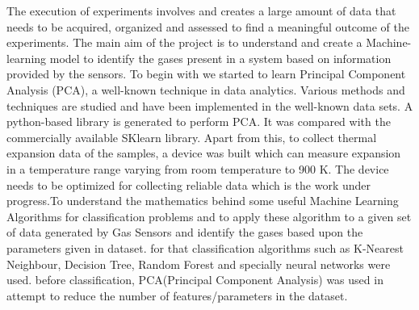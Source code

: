 \vspace{6pt}


\begin{flushleft}
    \setlength{\parskip}{0pt}
    { \par}
    \bigskip
    \vspace{6pt}
\end{flushleft} %
The execution of experiments involves and creates a large amount of data that needs to be acquired, organized and assessed to find a meaningful outcome of the experiments. The main aim of the project is to understand and create a Machine-learning model to identify the gases present in a system based on information provided by the sensors. To begin with we started to learn Principal Component Analysis (PCA), a well-known technique in data analytics. Various methods and techniques are studied and have been implemented in the well-known data sets. A python-based library is generated to perform PCA. It was compared with the commercially available SKlearn library.  Apart from this, to collect thermal expansion data of the samples, a device was built which can measure expansion in a temperature range varying from room temperature to 900 K. The device needs to be optimized for collecting reliable data which is the work under progress.To understand the mathematics behind some useful Machine Learning Algorithms for classification problems and to apply these algorithm to a given set of data generated by Gas Sensors and identify the gases based upon the parameters given in dataset. for that classification algorithms such as K-Nearest Neighbour, Decision Tree, Random Forest and specially neural networks were used. before classification, PCA(Principal Component Analysis) was used in attempt to reduce the number of features/parameters in the dataset. 

\vspace{3cm} 

\vfill
\clearpage